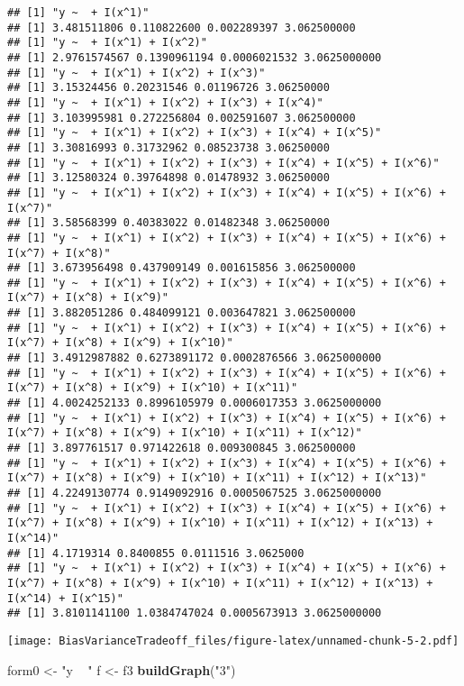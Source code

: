 \documentclass[]{article}
\newenvironment{Shaded}{\begin{snugshade}}{\end{snugshade}}
\newcommand{\KeywordTok}[1]{\textcolor[rgb]{0.13,0.29,0.53}{\textbf{#1}}}
\newcommand{\NormalTok}[1]{#1}
\newcommand{\StringTok}[1]{\textcolor[rgb]{0.31,0.60,0.02}{#1}}
\begin{document}
\begin{verbatim}
## [1] "y ~  + I(x^1)"
## [1] 3.481511806 0.110822600 0.002289397 3.062500000
## [1] "y ~  + I(x^1) + I(x^2)"
## [1] 2.9761574567 0.1390961194 0.0006021532 3.0625000000
## [1] "y ~  + I(x^1) + I(x^2) + I(x^3)"
## [1] 3.15324456 0.20231546 0.01196726 3.06250000
## [1] "y ~  + I(x^1) + I(x^2) + I(x^3) + I(x^4)"
## [1] 3.103995981 0.272256804 0.002591607 3.062500000
## [1] "y ~  + I(x^1) + I(x^2) + I(x^3) + I(x^4) + I(x^5)"
## [1] 3.30816993 0.31732962 0.08523738 3.06250000
## [1] "y ~  + I(x^1) + I(x^2) + I(x^3) + I(x^4) + I(x^5) + I(x^6)"
## [1] 3.12580324 0.39764898 0.01478932 3.06250000
## [1] "y ~  + I(x^1) + I(x^2) + I(x^3) + I(x^4) + I(x^5) + I(x^6) + I(x^7)"
## [1] 3.58568399 0.40383022 0.01482348 3.06250000
## [1] "y ~  + I(x^1) + I(x^2) + I(x^3) + I(x^4) + I(x^5) + I(x^6) + I(x^7) + I(x^8)"
## [1] 3.673956498 0.437909149 0.001615856 3.062500000
## [1] "y ~  + I(x^1) + I(x^2) + I(x^3) + I(x^4) + I(x^5) + I(x^6) + I(x^7) + I(x^8) + I(x^9)"
## [1] 3.882051286 0.484099121 0.003647821 3.062500000
## [1] "y ~  + I(x^1) + I(x^2) + I(x^3) + I(x^4) + I(x^5) + I(x^6) + I(x^7) + I(x^8) + I(x^9) + I(x^10)"
## [1] 3.4912987882 0.6273891172 0.0002876566 3.0625000000
## [1] "y ~  + I(x^1) + I(x^2) + I(x^3) + I(x^4) + I(x^5) + I(x^6) + I(x^7) + I(x^8) + I(x^9) + I(x^10) + I(x^11)"
## [1] 4.0024252133 0.8996105979 0.0006017353 3.0625000000
## [1] "y ~  + I(x^1) + I(x^2) + I(x^3) + I(x^4) + I(x^5) + I(x^6) + I(x^7) + I(x^8) + I(x^9) + I(x^10) + I(x^11) + I(x^12)"
## [1] 3.897761517 0.971422618 0.009300845 3.062500000
## [1] "y ~  + I(x^1) + I(x^2) + I(x^3) + I(x^4) + I(x^5) + I(x^6) + I(x^7) + I(x^8) + I(x^9) + I(x^10) + I(x^11) + I(x^12) + I(x^13)"
## [1] 4.2249130774 0.9149092916 0.0005067525 3.0625000000
## [1] "y ~  + I(x^1) + I(x^2) + I(x^3) + I(x^4) + I(x^5) + I(x^6) + I(x^7) + I(x^8) + I(x^9) + I(x^10) + I(x^11) + I(x^12) + I(x^13) + I(x^14)"
## [1] 4.1719314 0.8400855 0.0111516 3.0625000
## [1] "y ~  + I(x^1) + I(x^2) + I(x^3) + I(x^4) + I(x^5) + I(x^6) + I(x^7) + I(x^8) + I(x^9) + I(x^10) + I(x^11) + I(x^12) + I(x^13) + I(x^14) + I(x^15)"
## [1] 3.8101141100 1.0384747024 0.0005673913 3.0625000000
\end{verbatim}

\texttt{[image: BiasVarianceTradeoff\_files/figure-latex/unnamed-chunk-5-2.pdf]}

\begin{Shaded}
\begin{Highlighting}[]
\NormalTok{form0 <-}\StringTok{ "y ~ "}
\NormalTok{f <-}\StringTok{ }\NormalTok{f3}
\KeywordTok{buildGraph}\NormalTok{(}\StringTok{"3"}\NormalTok{)}
\end{Highlighting}
\end{Shaded}
\end{document}
